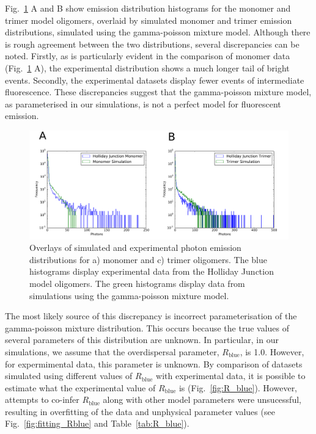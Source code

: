 Fig.~\ref{fig:HJ_sim_overlay} A and B show emission distribution histograms for the monomer and trimer model oligomers, overlaid by simulated monomer and trimer emission distributions, simulated using the gamma-poisson mixture model. Although there is rough agreement between the two distributions, several discrepancies can be noted. Firstly, as is particularly evident in the comparison of monomer data (Fig.~\ref{fig:HJ_sim_overlay} A), the experimental distribution shows a much longer tail of bright events. Secondly, the experimental datasets display fewer events of intermediate fluorescence. These discrepancies suggest that the gamma-poisson mixture model, as parameterised in our simulations, is not a perfect model for fluorescent emission.

\begin{figure}
   \begin{center}
      \includegraphics*[clip=true, width=6in]{sizing/HJ_overlays.pdf}
      \caption{Overlays of simulated and experimental photon emission distributions for a) monomer and c) trimer oligomers. The blue histograms display experimental data from the Holliday Junction model oligomers. The green histograms display data from simulations using the gamma-poisson mixture model.}
      \label{fig:HJ_sim_overlay}
   \end{center}
\end{figure}

The most likely source of this discrepancy is incorrect parameterisation of the gamma-poisson mixture distribution. This occurs because the true values of several parameters of this distribution are unknown. In particular, in our simulations, we assume that the overdispersal parameter, $R_{\text{blue}}$, is 1.0. However, for expermimental data, this parameter is unknown. By comparison of datasets simulated using different values of $R_{\text{blue}}$ with experimental data, it is possible to estimate what the experimental value of $R_{\text{blue}}$ is (Fig.~\ref{fig:R_blue}). However, attempts to co-infer $R_{\text{blue}}$ along with other model parameters were unsucessful, resulting in overfitting of the data and unphysical parameter values (see Fig.~\ref{fig:fitting_Rblue} and Table~\ref{tab:R_blue}).   


